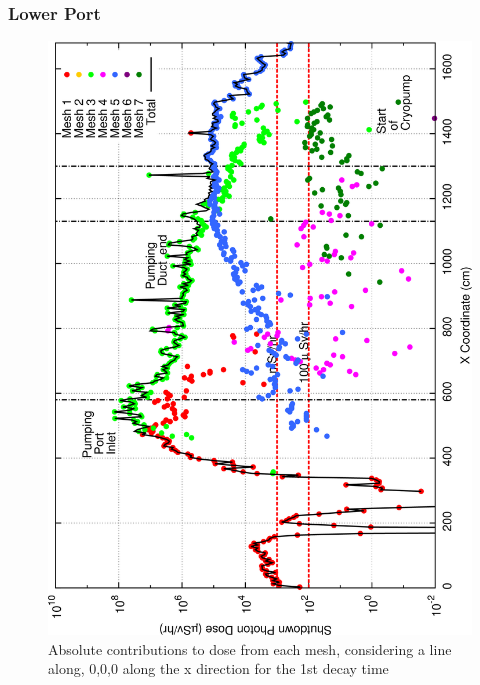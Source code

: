 \documentclass[12pt]{article}
\begin{document}
\subsubsection*{Lower Port}
\begin{figure}[ht!]
\centering
\includegraphics[clip,scale=0.25]{../plots/crosstalk/nob4c/lp/dc1.png}
\caption{Absolute contributions to dose from each mesh, considering a line along, 0,0,0 along the x direction for the 1st decay time}
\label{fig:ct_lp_dc1}
\end{figure}
\end{document}
